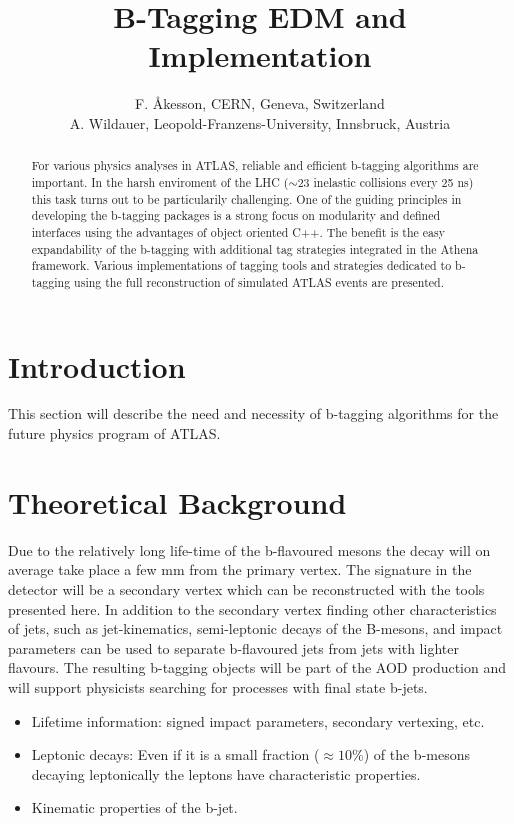 \documentclass[a4paper,12pt]{article}
\title{B-Tagging EDM and Implementation}
\author{
  F. {\AA}kesson, CERN, Geneva, Switzerland\\
  A. Wildauer, Leopold-Franzens-University, Innsbruck, Austria
}
\begin{document}
\maketitle

\begin{abstract}
For various physics analyses in ATLAS, reliable and efficient b-tagging
algorithms are important. In the harsh enviroment of the LHC ($\sim$23
inelastic collisions every 25 ns) this task turns out to be particularily 
challenging. One of the guiding principles in developing the b-tagging 
packages is a strong focus on modularity and defined interfaces using the 
advantages of object oriented C++. The benefit is the easy expandability 
of the b-tagging with additional tag strategies integrated in the Athena 
framework. Various implementations of tagging tools and strategies 
dedicated to b-tagging using the full reconstruction of simulated ATLAS 
events are presented.
\end{abstract}

\newpage

\section{Introduction}\label{intro}
This section will describe the need and necessity of b-tagging algorithms
for the future physics program of ATLAS.

\section{Theoretical Background}\label{theorie}
Due to the relatively long life-time of the b-flavoured mesons the decay 
will on average take place a few mm from the primary vertex. The signature 
in the detector will be a secondary vertex which can be reconstructed with 
the tools presented here. In addition to the secondary vertex finding other 
characteristics of jets, such as jet-kinematics, semi-leptonic decays of 
the B-mesons, and impact parameters can be used to separate b-flavoured jets 
from jets with lighter flavours. The resulting b-tagging objects will be 
part of the AOD production and will support physicists searching for 
processes with final state b-jets.

\begin{itemize}
\item Lifetime information: signed impact parameters, secondary vertexing, etc.
\item Leptonic decays: Even if it is a small fraction ($\approx 10\%$) of the
b-mesons decaying leptonically the leptons have characteristic properties.
\item Kinematic properties of the b-jet.
\end{itemize}
\end{document}

